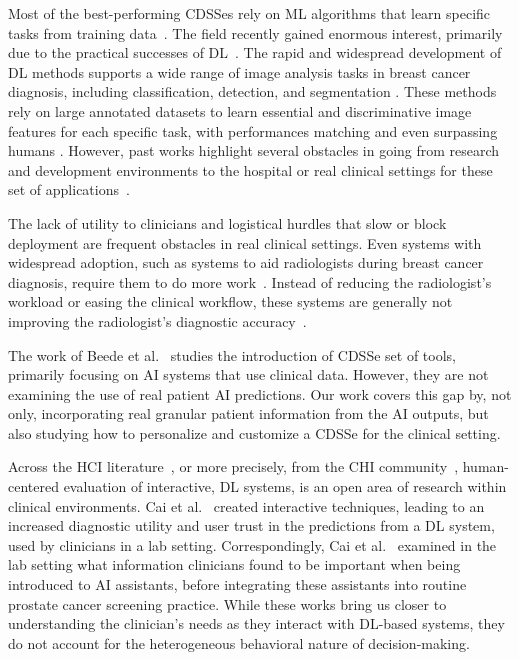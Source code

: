 Most of the best-performing \acp{CDSSe} rely on \ac{ML} algorithms that learn specific tasks from training data~\cite{10.1001/jama.2018.17163, 10.1145/3399715.3399744}.
The field recently gained enormous interest, primarily due to the practical successes of \ac{DL}~\cite{10.1007/978-3-030-22871-2_67}.
The rapid and widespread development of \ac{DL} methods supports a wide range of image analysis tasks in breast cancer diagnosis, including classification, detection, and segmentation \cite{lecun2015deep, DIN2022106073}.
These methods rely on large annotated datasets to learn essential and discriminative image features for each specific task, with performances matching and even surpassing humans \cite{Esteva2017}.
However, past works highlight several obstacles in going from research and development environments to the hospital or real clinical settings for these set of applications~\cite{https://doi.org/10.3322/caac.21552, 10.1145/3313831.3376718}.

The lack of utility to clinicians and logistical hurdles that slow or block deployment are frequent obstacles in real clinical settings.
Even systems with widespread adoption, such as systems to aid radiologists during breast cancer diagnosis, require them to do more work~\cite{KOHLI2018535}.
Instead of reducing the radiologist's workload or easing the clinical workflow, these systems are generally not improving the radiologist's diagnostic accuracy~\cite{KOHLI2018535}.

The work of Beede et al.~\cite{10.1145/3313831.3376718} studies the introduction of \ac{CDSSe} set of tools, primarily focusing on \ac{AI} systems that use clinical data.
However, they are not examining the use of real patient \ac{AI} predictions.
Our work covers this gap by, not only, incorporating real granular patient information from the \ac{AI} outputs, but also studying how to personalize and customize a \ac{CDSSe} for the clinical setting.

Across the \ac{HCI} literature~\cite{10.1145/3311957.3359433, 10.1145/3359206, 10.1145/3538882.3542790}, or more precisely, from the \acs{CHI} community~\cite{10.1145/3313831.3376718, 10.1145/3290605.3300234}, human-centered evaluation of interactive, \ac{DL} systems, is an open area of research within clinical environments.
Cai et al.~\cite{10.1145/3290605.3300234} created interactive techniques, leading to an increased diagnostic utility and user trust in the predictions from a \ac{DL} system, used by clinicians in a lab setting.
Correspondingly, Cai et al.~\cite{10.1145/3359206} examined in the lab setting what information clinicians found to be important when being introduced to \ac{AI} assistants, before integrating these assistants into routine prostate cancer screening practice.
While these works bring us closer to understanding the clinician's needs as they interact with \ac{DL}-based systems, they do not account for the heterogeneous behavioral nature of decision-making.

